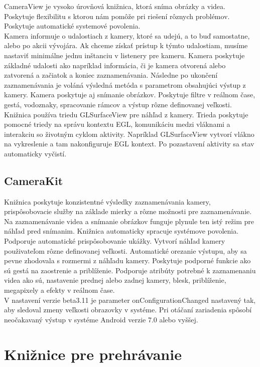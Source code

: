 \documentclass[12pt, oneside]{book}
\begin{document}
\hspace{15pt} CameraView je vysoko úrovňová knižnica, ktorá sníma obrázky a videa. Poskytuje flexibilitu s ktorou nám pomôže pri riešení rôznych problémov. Poskytuje automatické systemové povolenia.
\\
Kamera informuje o udalostiach z kamery, ktoré sa udejú, a to buď samostatne, alebo po akcii vývojára. Ak chceme získať prístup k týmto udalostiam, musíme nastaviť minimálne jednu inštanciu v listenery pre kameru.
Kamera poskytuje základné udalosti ako napríklad informácia, či je kamera otvorená alebo zatvorená a začiatok a koniec zaznamenávania. Následne po ukončení zaznamenávania je voláná výsledná metóda s parametrom obsahujúci výstup z kamery. Kamera poskytuje aj snímanie obrázkov. Poskytuje filtre v reálnom čase, gestá, vodoznaky, spracovanie rámcov a výstup rôzne definovanej veľkosti. 
\\
Knižnica používa triedu GLSurfaceView pre náhľad z kamery. Trieda poskytuje pomocné triedy na správu kontextu EGL, komunikáciu medzi vláknami a interakciu so životným cyklom aktivity. Napríklad GLSurfaceView vytvorí vlákno na vykreslenie a tam nakonfiguruje EGL kontext. Po pozastavení aktivity sa stav automaticky vyčistí.


\subsection{CameraKit}

\hspace{15pt} Knižnica poskytuje konzistentné výsledky zaznamenávania kamery, prispôsobovacie služby na základe mierky a rôzne možnosti pre zaznamenávanie. Na zaznamenávanie videa a snímanie obrázkov funguje plynule ten istý režim pre náhľad pred snímanim. Knižnica automaticky spracuje systémove povolenia. Podporuje automatické prispôsobovanie ukážky. Vytvorí náhľad kamery použivateľom rôzne definovanej veľkosti. Automatické orezanie výstupu, aby sa pevne zhodovala s rozmermi z náhľadu kamery. Poskytuje podporné funkcie ako sú gestá na zaostrenie a priblíženie. Podporuje atribúty potrebné k zaznamenaniu videa ako sú, nastavenie prednej alebo zadnej kamery, blesk, priblíženie, megapixely a efekty v reálnom čase. 
\\
V nastavení verzie beta3.11 je parameter onConfigurationChanged nastavený tak, aby sledoval zmeny veľkosti obrazovky v systéme. Pri otáčaní zariadenia spôsobí neočakavaný výstup v systéme Android verzie 7.0 alebo vyššej.
\cite{CameraKit}

\section{Knižnice pre prehrávanie}
\end{document}

